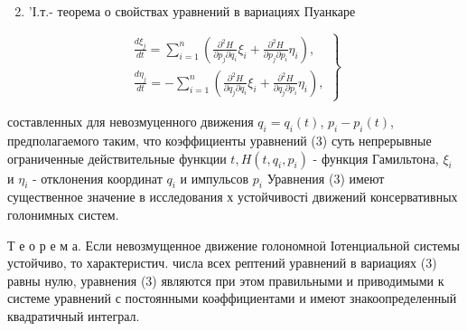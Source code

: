 \documentclass[10pt]{article}
\begin{document}
\begin{enumerate}

  \setcounter{enumi}{1}

  \item 'І.т.- теорема о свойствах уравнений в вариациях Пуанкаре

\end{enumerate}



\[

\left.\begin{array}{c}

\frac{d \xi_{j}}{d t}=\sum_{i=1}^{n}\left(\frac{\partial^{2} H}{\partial p_{j} \partial q_{i}} \xi_{i}+\frac{\partial^{2} H}{\partial p_{j} \partial p_{i}} \eta_{i}\right), \\

\frac{d \eta_{j}}{d t}=-\sum_{i=1}^{n}\left(\frac{\partial^{2} H}{\partial q_{j} \partial q_{i}} \xi_{i}+\frac{\partial^{2} H}{\partial q_{j} \partial p_{i}} \eta_{i}\right),

\end{array}\right\}

\]



составленных для невозмуценного движения $q_{i}=q_{i}(t)$, $p_{i}-p_{i}(t)$, предполагаемого таким, что коэффициенты уравнений (3) суть непрерывные ограниченные действительные функции $t, H\left(t, q_{i}, p_{i}\right)$ - функция Гамильтона, $\xi_{i}$ и $\eta_{i}$ - отклонения координат $q_{i}$ и импульсов $p_{i}$ Уравнения (3) имеют существенное значение в исследования х устойчивості движений консервативных голонимных систем.



Т е о р е м а. Если невозмущенное движение голономноӥ Іотенциальной системы устойчиво, то характеристич. числа всех рептений уравнений в вариациях (3) равны нулю, уравнения (3) являются при этом правильными и приводимыми к системе уравнений с постоянными коәффициентами и имеют знакоопределенный квадратичный интеграл.
\end{document}

